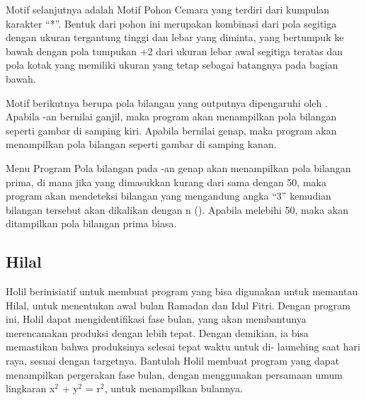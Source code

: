 \documentclass[../main.tex]{subfiles}
\begin{document}
    Motif selanjutnya adalah Motif Pohon Cemara yang terdiri dari kumpulan karakter ``*''. Bentuk dari pohon ini merupakan kombinasi dari pola segitiga dengan ukuran tergantung tinggi dan lebar yang diminta, yang bertumpuk ke bawah dengan pola tumpukan +2 dari ukuran lebar awal segitiga teratas dan pola kotak yang memiliki ukuran yang tetap sebagai batangnya pada bagian bawah.

    Motif berikutnya berupa pola bilangan yang outputnya dipengaruhi oleh {\ioi}. Apabila {\ioi}-an bernilai ganjil, maka program akan menampilkan pola bilangan seperti gambar di samping kiri. Apabila {\ioi} bernilai genap, maka program akan menampilkan pola bilangan seperti gambar di samping kanan.

    Menu Program Pola bilangan pada {\ioi}-an genap akan menampilkan pola bilangan prima, di mana jika {\ioi} yang dimasukkan kurang dari sama dengan 50, maka program akan mendeteksi bilangan yang mengandung angka ``3'' kemudian bilangan tersebut akan dikalikan dengan n ({\ioi}). Apabila {\ioi} melebihi 50, maka akan ditampilkan pola bilangan prima biasa.

    \subsection{Hilal}
    Holil berinisiatif untuk membuat program yang bisa digunakan untuk memantau Hilal, untuk menentukan awal bulan Ramadan dan Idul Fitri. Dengan program ini, Holil dapat mengidentifikasi fase bulan, yang akan membantunya merencanakan produksi dengan lebih tepat. Dengan demikian, ia bisa memastikan bahwa produksinya selesai tepat waktu untuk di- launching saat hari raya, sesuai dengan targetnya. Bantulah Holil membuat program yang dapat menampilkan pergerakan fase bulan, dengan menggunakan persamaan umum lingkaran x$^2$ + y$^2$ = r$^2$, untuk menampilkan bulannya.
\end{document}
